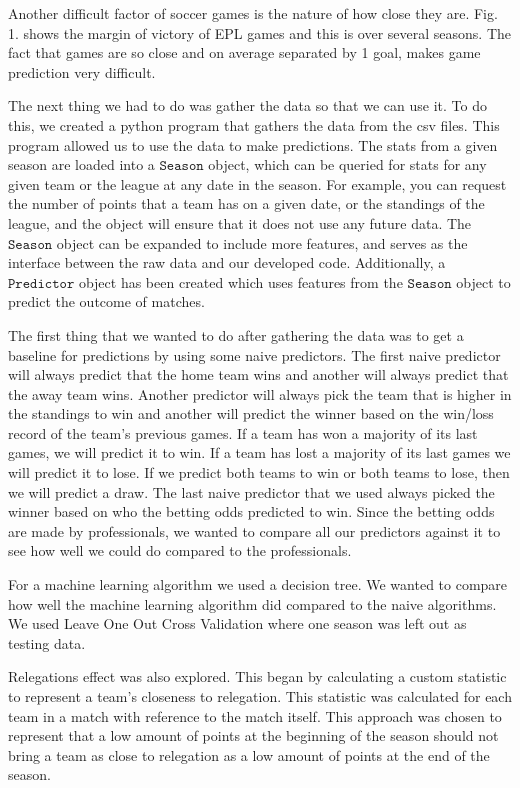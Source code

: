 \documentclass[conference]{IEEEtran}
\begin{document}
Another difficult factor of soccer games is the nature of how close they are. Fig. 1. shows the margin of victory of EPL games and this is over several seasons. The fact that games are so close and on average separated by 1 goal, makes game prediction very difficult.


The next thing we had to do was gather the data so that we can use it. To do this, we created a python program that gathers the data from the csv files. This program allowed us to use the data to make predictions. The stats from a given season are loaded into a $\mathtt{Season}$ object, which can be queried for stats for any given team or the league at any date in the season. For example, you can request the number of points that a team has on a given date, or the standings of the league, and the object will ensure that it does not use any future data. The $\mathtt{Season}$ object can be expanded to include more features, and serves as the interface between the raw data and our developed code. Additionally, a $\mathtt{Predictor}$ object has been created which uses features from the $\mathtt{Season}$ object to predict the outcome of matches.

The first thing that we wanted to do after gathering the data was to get a baseline for predictions by using some naive predictors. The first naive predictor will always predict that the home team wins and another will always predict that the away team wins. Another predictor will always pick the team that is higher in the standings to win and another will predict the winner based on the win/loss record of the team's previous games. If a team has won a majority of its last games, we will predict it to win. If a team has lost a majority of its last games we will predict it to lose. If we predict both teams to win or both teams to lose, then we will predict a draw. The last naive predictor that we used always picked the winner based on who the betting odds predicted to win. Since the betting odds are made by professionals, we wanted to compare all our predictors against it to see how well we could do compared to the professionals.

For a machine learning algorithm we used a decision tree. We wanted to compare how well the machine learning algorithm did compared to the naive algorithms. We used Leave One Out Cross Validation where one season was left out as testing data.

Relegations effect was also explored. This began by calculating a custom statistic to represent a team's closeness to relegation. This statistic was calculated for each team in a match with reference to the match itself. This approach was chosen to represent that a low amount of points at the beginning of the season should not bring a team as close to relegation as a low amount of points at the end of the season.
\end{document}
